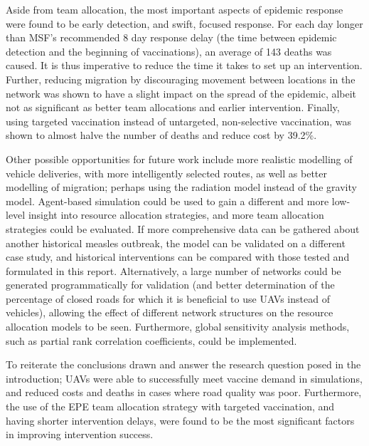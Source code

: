 Aside from team allocation, the most important aspects of epidemic response were found to be early detection, and swift, focused response. For each day longer than MSF's recommended 8 day response delay (the time between epidemic detection and the beginning of vaccinations), an average of 143 deaths was caused. It is thus imperative to reduce the time it takes to set up an intervention. Further, reducing migration by discouraging movement between locations in the network was shown to have a slight impact on the spread of the epidemic, albeit not as significant as better team allocations and earlier intervention. Finally, using targeted vaccination instead of untargeted, non-selective vaccination, was shown to almost halve the number of deaths and reduce cost by 39.2\%.

Other possible opportunities for future work include more realistic modelling of vehicle deliveries, with more intelligently selected routes, as well as better modelling of migration; perhaps using the radiation model instead of the gravity model. Agent-based simulation could be used to gain a different and more low-level insight into resource allocation strategies, and more team allocation strategies could be evaluated. If more comprehensive data can be gathered about another historical measles outbreak, the model can be validated on a different case study, and historical interventions can be compared with those tested and formulated in this report. Alternatively, a large number of networks could be generated programmatically for validation (and better determination of the percentage of closed roads for which it is beneficial to use UAVs instead of vehicles), allowing the effect of different network structures on the resource allocation models to be seen. Furthermore, global sensitivity analysis methods, such as partial rank correlation coefficients, could be implemented.

To reiterate the conclusions drawn and answer the research question posed in the introduction; UAVs were able to successfully meet vaccine demand in simulations, and reduced costs and deaths in cases where road quality was poor. Furthermore, the use of the EPE team allocation strategy with targeted vaccination, and having shorter intervention delays, were found to be the most significant factors in improving intervention success.